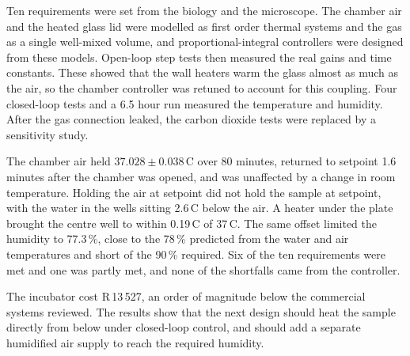 Ten requirements were set from the biology and the microscope. The chamber air and the heated glass lid were modelled as first order thermal systems and the gas as a single well-mixed volume, and proportional-integral controllers were designed from these models. Open-loop step tests then measured the real gains and time constants. These showed that the wall heaters warm the glass almost as much as the air, so the chamber controller was retuned to account for this coupling. Four closed-loop tests and a 6.5 hour run measured the temperature and humidity. After the gas connection leaked, the carbon dioxide tests were replaced by a sensitivity study.

The chamber air held $37.028 \pm 0.038$\,\textdegree{}C over 80 minutes, returned to setpoint 1.6 minutes after the chamber was opened, and was unaffected by a change in room temperature. Holding the air at setpoint did not hold the sample at setpoint, with the water in the wells sitting 2.6\,\textdegree{}C below the air. A heater under the plate brought the centre well to within 0.19\,\textdegree{}C of 37\,\textdegree{}C. The same offset limited the humidity to 77.3\,\%, close to the 78\,\% predicted from the water and air temperatures and short of the 90\,\% required. Six of the ten requirements were met and one was partly met, and none of the shortfalls came from the controller.

The incubator cost R\,13\,527, an order of magnitude below the commercial systems reviewed. The results show that the next design should heat the sample directly from below under closed-loop control, and should add a separate humidified air supply to reach the required humidity.
